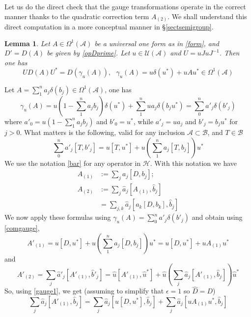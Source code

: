 \documentclass[preprint]{revtex4}
\newtheorem{lma}[thm]{Lemma}
\begin{document}
Let us do the direct check that the gauge transformations operate in the correct manner thanks to the quadratic correction term $A_{(2)}$. We shall understand this direct computation in a more conceptual manner in \S \ref{sectsemigroup}.
\begin{lma} Let $A\in \Omega^1({\mathcal{A}})$ be a universal one form as in \eqref{form}, and $D'=D(A)$  be given by \eqref{opDprime}. Let $u \in {\mathcal{U}}({\mathcal{A}})$ and $U = u JuJ^{-1}$. Then one has
\begin{equation}\label{gauge}
    UD(A)U^*=D(\gamma_u(A)), \ \ \ \gamma_u(A)=u\delta(u^*)+uAu^*\in \Omega^1({\mathcal{A}})
\end{equation}
\end{lma}
\proof  Let $A=\sum_1^n a_j \delta(b_j)\in \Omega^1({\mathcal{A}})$, one has
\begin{equation*}
   \gamma_u(A)=u(1-\sum_1^n a_jb_j)\delta(u^*)+\sum_1^n ua_j\delta(b_ju^*)=\sum_0^n a'_j \delta(b'_j)
\end{equation*}
where $a'_0=u(1-\sum_1^n a_jb_j)$ and $b'_0=u^*$, while $a'_j=ua_j$ and $b'_j=b_ju^*$ for $j>0$.
What matters is the following, valid for any inclusion ${\mathcal{A}}\subset {\mathcal{B}}$, and $T\in {\mathcal{B}}$
\begin{equation}\label{comgauge}
    \sum_0^n a'_j [T,b'_j]=u[T,u^*]+u\left(\sum_1^n a_j[T,b_j]\right) u^*
\end{equation}
We use the notation \eqref{bar} for any operator in ${\mathcal{H}}$.
With this notation we have
\begin{align*}
A_{(1)} &:= \sum_j a_j [D,b_j];\\
A_{(2)} &:= \sum_j \hat a_j [ A_{(1)}, \hat b_j ] \\&= \sum_{j,k} \hat a_j  [ a_k [D,b_k], \hat b_j]
\end{align*}
We now apply these formulas using $\gamma_u(A)=\sum_0^n a'_j \delta(b'_j)$ and obtain using \eqref{comgauge},
\begin{equation}\label{gauge1}
    A'_{(1)}=u[D,u^*]+u\left(\sum_1^n a_j[D,b_j]\right) u^*=u[D,u^*]+u A_{(1)}u^*
\end{equation}
and
\begin{equation}\label{gaugeA2}
    A'_{(2)}=\sum_j \hat a'_j [ A'_{(1)}, \hat b'_j ]=
    \hat u [A'_{(1)}, \hat u^*]+\hat u\left(\sum_j \hat a_j [ A'_{(1)}, \hat b_j ]\right)\hat u^*
\end{equation}
So, using \eqref{gauge1}, we get (assuming to simplify that $\epsilon=1$ so $\hat D=D$)
\begin{equation*}
   \sum_j \hat a_j [ A'_{(1)}, \hat b_j ]=\sum_j \hat a_j [u[D,u^*], \hat b_j ]+\sum_j \hat a_j [ uA_{(1)}u^*, \hat b_j ]
\end{equation*}
\end{document}

